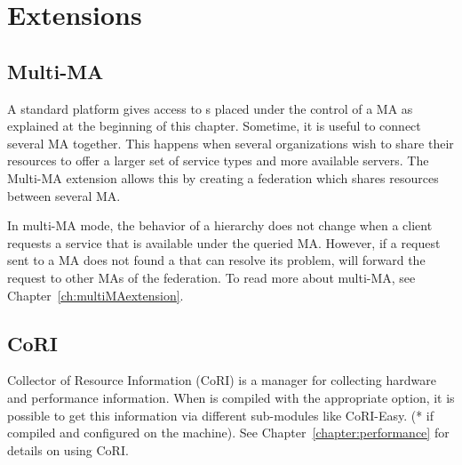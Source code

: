 \section{\diet Extensions}
\label{sec:extensions}

\subsection{Multi-MA}
\label{init:multima}

A standard \diet platform gives access to {\sed}s placed under the control of a
MA as explained at the beginning of this chapter. Sometime, it is useful to
connect several MA together. This happens when several organizations wish to
share their resources to offer a larger set of service types and more available
servers. The Multi-MA extension allows this by creating a federation which
shares resources between several MA.

In multi-MA mode, the behavior of a \diet hierarchy does not change when a
client requests a service that is available under the queried MA. However, if a
request sent to a MA does not found a \sed that can resolve its problem, \diet
will forward the request to other MAs of the federation. To read more about
multi-MA, see Chapter~\ref{ch:multiMAextension}. 

\subsection{CoRI}
\label{sub:cori}

Collector of Resource Information (CoRI) is a manager for collecting hardware
and performance information.  When \diet is compiled with the appropriate
option, it is possible to get this information via different sub-modules like
 CoRI-Easy. (* if compiled and configured on the \sed machine). See
Chapter~\ref{chapter:performance} for details on using CoRI.




